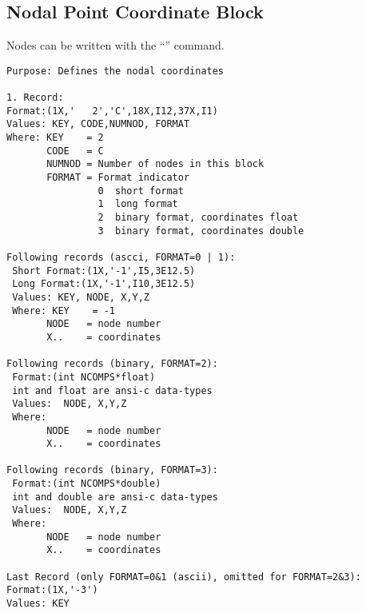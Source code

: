 \documentclass{article}
\begin{document}
\subsection{\label{Nodal Point Coordinate Block}Nodal Point Coordinate Block}
Nodes can be written with the ``'' command.
\begin{verbatim}
Purpose: Defines the nodal coordinates

1. Record:
Format:(1X,'   2','C',18X,I12,37X,I1)
Values: KEY, CODE,NUMNOD, FORMAT
Where: KEY    = 2
       CODE   = C
       NUMNOD = Number of nodes in this block
       FORMAT = Format indicator
                0  short format
                1  long format 
                2  binary format, coordinates float 
                3  binary format, coordinates double 

Following records (ascci, FORMAT=0 | 1):
 Short Format:(1X,'-1',I5,3E12.5)
 Long Format:(1X,'-1',I10,3E12.5)
 Values: KEY, NODE, X,Y,Z
 Where: KEY    = -1
       NODE   = node number
       X..    = coordinates

Following records (binary, FORMAT=2):
 Format:(int NCOMPS*float)
 int and float are ansi-c data-types
 Values:  NODE, X,Y,Z
 Where: 
       NODE   = node number
       X..    = coordinates

Following records (binary, FORMAT=3):
 Format:(int NCOMPS*double)
 int and double are ansi-c data-types
 Values:  NODE, X,Y,Z
 Where: 
       NODE   = node number
       X..    = coordinates
  
Last Record (only FORMAT=0&1 (ascii), omitted for FORMAT=2&3):
Format:(1X,'-3')
Values: KEY
\end{verbatim}
\end{document}

